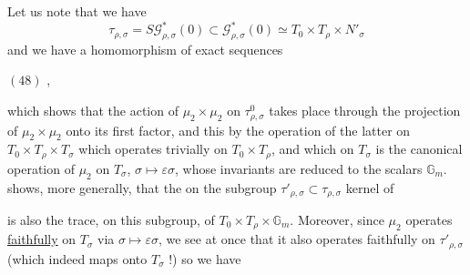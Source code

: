 
Let us note that we have
\[
\tau_{\rho,\sigma}=S\mathcal G^*_{\rho,\sigma}(0)\subset\mathcal G^*_{\rho,\sigma}(0)\simeq T_0\times T_\rho\times N'_\sigma
\]
and we have a homomorphism of exact sequences

\noindent$(48)$\quad
{},

which shows that the action of $\mu_2\times\mu_2$ on \deleted{$\unsure{\tau}$} $\tau^0_{\rho,\sigma}$ takes place through the projection of $\mu_2\times\mu_2$ onto its first factor, and this by the operation of the latter on $T_0\times T_\rho\times T_\sigma$ which operates trivially on $T_0\times T_\rho$, and which on $T_\sigma$ is the canonical operation of $\mu_2$ on $T_\sigma$, $\sigma\mapsto\varepsilon\sigma$, whose invariants are reduced to the scalars $\mathbb G_m$.   shows, more generally, that the   on the subgroup $\tau'_{\rho,\sigma}\subset\tau_{\rho,\sigma}$ kernel of


is also the trace, on this subgroup, of $T_0\times T_\rho\times\mathbb G_m$. Moreover, since $\mu_2$ operates \uline{faithfully} on $T_\sigma$ via $\sigma\mapsto\varepsilon\sigma$, we see  at once that it also operates faithfully on $\tau'_{\rho,\sigma}$ (which indeed maps \uline{} onto $T_\sigma$ !) so we have

